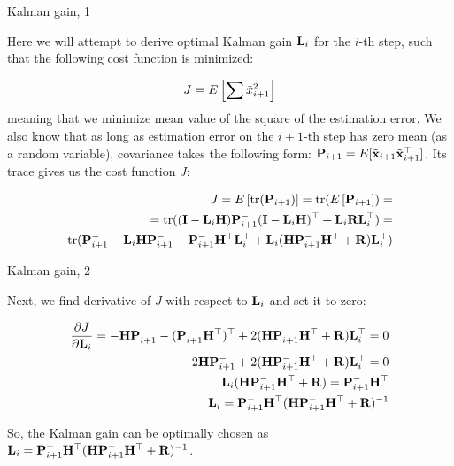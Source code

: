 \documentclass{beamer}
\begin{document}
\begin{frame}{Kalman gain, 1}
	\begin{flushleft}
		
		Here we will attempt to derive optimal Kalman gain $\mathbf{L}_i$ for the $i$-th step, such that the following cost function is minimized:
		
		\begin{equation}
			J = E \left[ \sum \Tilde x_{i+1}^2  \right]
		\end{equation}
		meaning that we minimize mean value of the square of the estimation error. We also know that as long as estimation error on the $i+1$-th step has zero mean (as a random variable), covariance takes the following form: $\mathbf{P}_{i+1} = E [ \Tilde{\mathbf{x}}_{i+1} \Tilde{\mathbf{x}}_{i+1}^\top ]$. Its trace gives us the cost function $J$:
		
		\begin{align*}
			J = E \left[ \text{tr}(\mathbf{P}_{i+1})  \right] =
			\text{tr} (E \left[ \mathbf{P}_{i+1}  \right]) = \\
			= \text{tr}(
			(\mathbf{I} - \mathbf{L}_i \mathbf{H}) \mathbf{P}_{i+1}^- (\mathbf{I} - \mathbf{L}_i \mathbf{H})^\top +\mathbf{L}_i\mathbf{R}\mathbf{L}_i^\top
			) = \\
			\text{tr}(
			\mathbf{P}_{i+1}^- - \mathbf{L}_i \mathbf{H} \mathbf{P}_{i+1}^- 
			- \mathbf{P}_{i+1}^- \mathbf{H}^\top \mathbf{L}_i^\top
			+ \mathbf{L}_i (\mathbf{H}\mathbf{P}_{i+1}^- \mathbf{H}^\top + \mathbf{R}) \mathbf{L}_i^\top
			)
		\end{align*}		
		
		
	\end{flushleft}
\end{frame}



\begin{frame}{Kalman gain, 2}
	\begin{flushleft}
		
		Next, we find derivative of $J$ with respect to $\mathbf{L}_i$ and set it to zero:
		
		\begin{align*}
			\frac{\partial J}{\partial \mathbf{L}_i} 
			= 
			-\mathbf{H} \mathbf{P}_{i+1}^- -(\mathbf{P}_{i+1}^- \mathbf{H}^\top)^\top + 
			2(\mathbf{H}\mathbf{P}_{i+1}^- \mathbf{H}^\top + \mathbf{R}) \mathbf{L}_i^\top = 0
			\\
			-2 \mathbf{H} \mathbf{P}_{i+1}^- + 2(\mathbf{H}\mathbf{P}_{i+1}^- \mathbf{H}^\top + \mathbf{R}) \mathbf{L}_i^\top = 0
			\\
			\mathbf{L}_i (\mathbf{H}\mathbf{P}_{i+1}^- \mathbf{H}^\top + \mathbf{R}) = \mathbf{P}_{i+1}^- \mathbf{H}^\top
			\\
			\mathbf{L}_i = \mathbf{P}_{i+1}^- \mathbf{H}^\top (\mathbf{H}\mathbf{P}_{i+1}^- \mathbf{H}^\top + \mathbf{R})^{-1}
		\end{align*}		
		
		
So, the Kalman gain can be optimally chosen as $\mathbf{L}_i = \mathbf{P}_{i+1}^- \mathbf{H}^\top (\mathbf{H}\mathbf{P}_{i+1}^- \mathbf{H}^\top + \mathbf{R})^{-1}$.
		
	\end{flushleft}
\end{frame}
\end{document}
